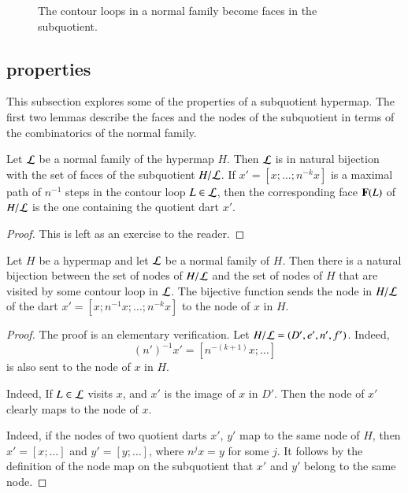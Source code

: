 \begin{figure}[htb]
\centering
{}
\caption{The contour loops in a normal family become faces in the
subquotient.}
\label{fig:quot}
\end{figure}

\subsection{properties}

This subsection explores some of the properties of a subquotient hypermap.
The first two lemmas describe the faces and the nodes of the subquotient
in terms of the combinatorics of the normal family.

\begin{lemma}\label{lemma:subquotient-bijection}
  Let ${\cal L}$ be a normal family of the hypermap $H$.  Then ${\cal
    L}$ is in natural bijection with the set of faces of the subquotient
  $H/{\cal L}$.  If $x'=[x;\ldots;n^{-k}x]$ is a maximal path of
  $n^{-1}$ steps in the contour loop $L\in{\cal L}$, then the
  corresponding face ${\mathbf F}(L)$ of $H/{\cal L}$ is the
  one containing the quotient dart $x'$.
\end{lemma}

\begin{proof}  This is left as an exercise to the reader.
\end{proof}


\begin{lemma}\label{lemma:subquotient-node}
Let $H$ be a hypermap and let ${\cal L}$ be a normal family of $H$.
Then there is a natural bijection between  the set of nodes of
$H/{\cal L}$ and the set of nodes of $H$ that
are visited by some contour loop in ${\cal L}$.   
The bijective function sends the node in $H/{\cal L}$ of 
the dart $x' = [x;n^{-1} x;\ldots;n^{-k}x]$ to the node of $x$ in $H$.
\end{lemma}

\begin{proof}  The proof is an elementary verification.
Let $H/{\cal L} = (D',e',n',f')$.
  Indeed, 
 \[ 
(n')^{-1} x' = [n^{-(k+1)} x;\ldots]
\] 
 is also sent to the node of $x$ in $H$.

  Indeed,
If $L\in {\cal L}$ visits $x$,  and $x'$ is the image of $x$ in $D'$.
Then the node of $x'$ clearly maps to the node of $x$.  

  Indeed, if the nodes of
two quotient darts $x'$, $y'$ map to the same node of $H$, then
$x'=[x;\ldots]$ and $y'=[y;\ldots]$, where $n^j x = y$ for some $j$.
It follows by the definition of the node map on the subquotient that
$x'$ and $y'$ belong to the same node.
\end{proof}

